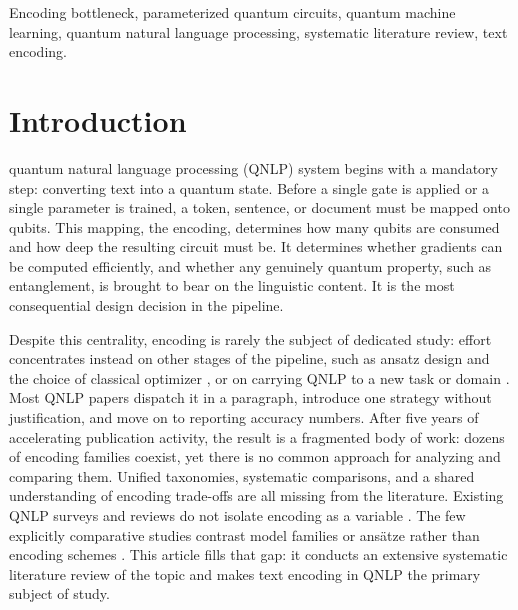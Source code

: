 \documentclass{ieeeaccess}
\begin{document}
\begin{keywords}
Encoding bottleneck, parameterized quantum circuits, quantum machine learning, quantum natural language processing, systematic literature review, text encoding.
\end{keywords}

\titlepgskip=-15pt

\maketitle

\section{Introduction}
\label{sec:introduction}
 quantum natural language processing (QNLP) system begins with a mandatory step: converting text into a quantum state. Before a single gate is applied or a single parameter is trained, a token, sentence, or document must be mapped onto qubits. This mapping, the encoding, determines how many qubits are consumed and how deep the resulting circuit must be. It determines whether gradients can be computed efficiently, and whether any genuinely quantum property, such as entanglement, is brought to bear on the linguistic content. It is the most consequential design decision in the pipeline.

Despite this centrality, encoding is rarely the subject of dedicated study: effort concentrates instead on other stages of the pipeline, such as ansatz design \cite{ruskanda_simple_2023,abiwardani_generalized_2025} and the choice of classical optimizer \cite{rajashekharaiah_sentence_2023}, or on carrying QNLP to a new task or domain \cite{abbaszadeh_hybrid_2026,kesiku_unlocking_2026}. Most QNLP papers dispatch it in a paragraph, introduce one strategy without justification, and move on to reporting accuracy numbers. After five years of accelerating publication activity, the result is a fragmented body of work: dozens of encoding families coexist, yet there is no common approach for analyzing and comparing them. Unified taxonomies, systematic comparisons, and a shared understanding of encoding trade-offs are all missing from the literature. Existing QNLP surveys and reviews do not isolate encoding as a variable \cite{chen_survey_2024,pallavi_quantum_2025}. The few explicitly comparative studies contrast model families or ans\"atze rather than encoding schemes \cite{bouakba_comparative_2025,castillo_comparative_2025}. This article fills that gap: it conducts an extensive systematic literature review of the topic and makes text encoding in QNLP the primary subject of study.
\end{document}
